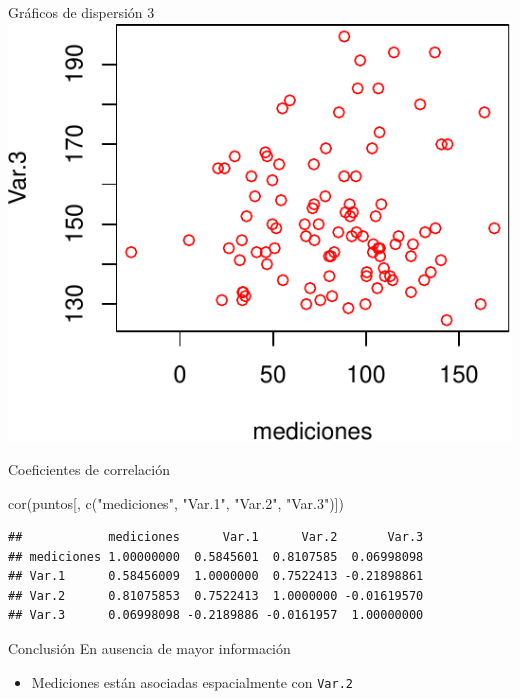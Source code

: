 \documentclass[
  11pt,
  ignorenonframetext,
]{beamer}
\newenvironment{Shaded}{}{}
\newcommand{\FunctionTok}[1]{\textcolor[rgb]{0.02,0.16,0.49}{#1}}
\newcommand{\NormalTok}[1]{#1}
\newcommand{\StringTok}[1]{\textcolor[rgb]{0.25,0.44,0.63}{#1}}
\providecommand{\tightlist}{%
  \setlength{\itemsep}{0pt}\setlength{\parskip}{0pt}}
\begin{document}
\begin{frame}{Gráficos de dispersión 3}
\protect\hypertarget{gruxe1ficos-de-dispersiuxf3n-3}{}
\includegraphics{Correlacion-espacial_files/figure-beamer/unnamed-chunk-15-1.pdf}
\end{frame}

\begin{frame}[fragile]{Coeficientes de correlación}
\protect\hypertarget{coeficientes-de-correlaciuxf3n}{}
\begin{Shaded}
\begin{Highlighting}[]
\FunctionTok{cor}\NormalTok{(puntos[, }\FunctionTok{c}\NormalTok{(}\StringTok{"mediciones"}\NormalTok{, }\StringTok{"Var.1"}\NormalTok{, }\StringTok{"Var.2"}\NormalTok{, }\StringTok{"Var.3"}\NormalTok{)])}
\end{Highlighting}
\end{Shaded}

\begin{verbatim}
##            mediciones      Var.1      Var.2       Var.3
## mediciones 1.00000000  0.5845601  0.8107585  0.06998098
## Var.1      0.58456009  1.0000000  0.7522413 -0.21898861
## Var.2      0.81075853  0.7522413  1.0000000 -0.01619570
## Var.3      0.06998098 -0.2189886 -0.0161957  1.00000000
\end{verbatim}
\end{frame}

\begin{frame}[fragile]{Conclusión}
\protect\hypertarget{conclusiuxf3n}{}
En ausencia de mayor información

\begin{itemize}
\tightlist
\item
  Mediciones están asociadas espacialmente con \texttt{Var.2}
\end{itemize}
\end{frame}
\end{document}
